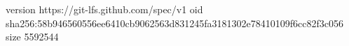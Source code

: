version https://git-lfs.github.com/spec/v1
oid sha256:58b946560556ee6410cb9062563d831245fa3181302e78410109f6cc82f3c056
size 5592544

